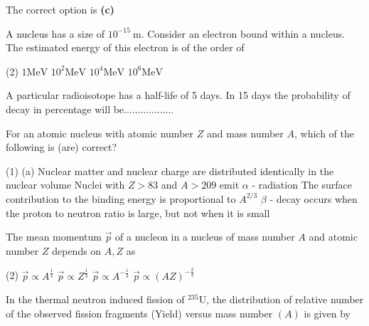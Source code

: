 \begin{enumerate}[ label=\color{ocre}\textbf{\arabic*.}]
\begin{answer}
 The correct option is \textbf{(c)} 
\end{answer}
\begin{minipage}{\textwidth}
	\item A nucleus has a size of $10^{-15} \mathrm{~m}$. Consider an electron bound within a nucleus. The estimated energy of this electron is of the order of
\end{minipage}
\begin{tasks}(2)
	\task[\textbf{A.}]$1 \mathrm{MeV}$
	\task[\textbf{B.}]$10^{2} \mathrm{MeV}$
	\task[\textbf{C.}]$10^{4} \mathrm{MeV}$
	\task[\textbf{D.}]$10^{6} \mathrm{MeV}$
\end{tasks}
\begin{minipage}{\textwidth}
	\item A particular radioisotope has a half-life of 5 days. In 15 days the probability of decay in percentage will be..................
\end{minipage}
\begin{minipage}{\textwidth}
	\item For an atomic nucleus with atomic number $Z$ and mass number $A$, which of the following is (are) correct?
\end{minipage}
\begin{tasks}(1)
	\task[\textbf{A.}](a) Nuclear matter and nuclear charge are distributed identically in the nuclear volume
	\task[\textbf{B.}]Nuclei with $Z>83$ and $A>209$ emit $\alpha$ - radiation
	\task[\textbf{C.}] The surface contribution to the binding energy is proportional to $A^{2 / 3}$
	\task[\textbf{D.}]$\beta$ - decay occurs when the proton to neutron ratio is large, but not when it is small
\end{tasks}
\begin{minipage}{\textwidth}
	\item The mean momentum $\vec{p}$ of a nucleon in a nucleus of mass number $A$ and atomic number $Z$ depends on $A, Z$ as
\end{minipage}
\begin{tasks}(2)
	\task[\textbf{A.}] $\vec{p} \propto A^{\frac{1}{3}}$
	\task[\textbf{B.}]$\vec{p} \propto Z^{\frac{1}{3}}$
	\task[\textbf{C.}]$\vec{p} \propto A^{-\frac{1}{3}}$
	\task[\textbf{D.}]$\vec{p} \propto(A Z)^{-\frac{2}{3}}$
\end{tasks}
\begin{minipage}{\textwidth}
	\item In the thermal neutron induced fission of ${ }^{235} \mathrm{U}$, the distribution of relative number of the observed fission fragments (Yield) versus mass number $(A)$ is given by

\end{minipage}
\end{enumerate}

